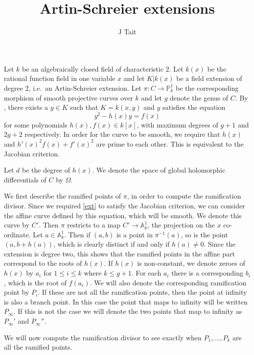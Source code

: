 \documentclass[11pt]{article} %
\title{Artin-Schreier extensions}
\author{J Tait}
\theoremstyle{remark}\newtheorem*{rem}{Remark}
\begin{document}
\maketitle
Let $k$ be an algebraically closed field of characteristic 2.
Let $k(x)$ be the rational function field in one variable $x$ and let $K|k(x)$ be a field extension of degree 2, i.e.\ an Artin-Schreier extension.
Let $\pi:C \rightarrow \mathbb P_k^1$ be the corresponding morphism of smooth projective curves over $k$ and let $g$ denote the genus of $C$.
By \cite[\S 7.4.3]{liu}, there exists a $y\in K$ such that $K=k(x,y)$ and $y$ satisfies the equation
\begin{equation}\label{ext}
  y^2 - h(x)y = f(x)
\end{equation}
for some polynomials $h(x), f(x)\in k[x]$, with maximum degrees of $g+1$ and $2g+2$ respectively.
In order for the curve to be smooth, we require that $h(x)$ and $h'(x)^2f(x) + f'(x)^2$ are prime to each other.
This is equivalent to the Jacobian criterion.

Let $d$ be the degree of $h(x)$.
We denote the space of global holomorphic differentials of $C$ by $\Omega$.

We first describe the ramified points of $\pi$, in order to compute the ramification divisor.
Since we required \eqref{ext} to satisfy the Jacobian criterion, we can consider the affine curve defined by this equation, which will be smooth.
We denote this curve by $C'$.
Then $\pi$ restricts to a map $C'\rightarrow \mathbb A^1_k$, the projection on the $x$ co-ordinate.
Let $a\in \mathbb A_k^1$.
Then if $(a,b)$ is a point in $\pi^{-1}(a)$, so is the point $(a,b+h(a))$, which is clearly distinct if and only if $h(a)\neq 0$.
Since the extension is degree two, this shows that the ramified points in the affine part correspond to the roots of $h(x)$.
If $h(x)$ is non-constant, we denote zeroes of $h(x)$ by $a_i$ for $1\leq i \leq k$ where $k \leq g+1$.
For each $a_i$ there is a corresponding $b_i$, which is the root of $f(a_i)$.
We will also denote the corresponding ramification point by $P_i$.
If these are not all the ramification points, then the point at infinity is also a branch point.
In this case the point that maps to infinity will be written $P_{\infty}$.
If this is not the case we will denote the two points that map to infinity as $P_{\infty}'$ and $P_{\infty}''$.

We will now compute the ramification divisor to see exactly when $P_1,\ldots,P_k$ are all the ramified points.\\
\end{document}
